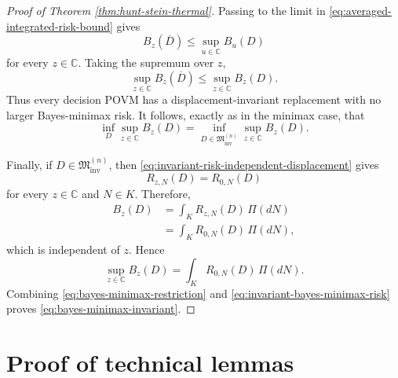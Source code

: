 \documentclass{article}
\theoremstyle{named}
\theoremstyle{named1}
\newcommand{\bbC}{\mathbb C}
\newcommand{\cM}{\mathfrak M}
\theoremstyle{plain}
\theoremstyle{remark}
\begin{document}
\begin{proof}[Proof of Theorem \ref{thm:hunt-stein-thermal}]
Passing to the limit in
\eqref{eq:averaged-integrated-risk-bound} gives
\begin{equation}
    B_z(\overline D)
    \leq
    \sup_{u\in\bbC}B_u(D)
    \label{eq:limit-integrated-risk-bound}
\end{equation}
for every \(z\in\bbC\). Taking the supremum over \(z\),
\begin{equation}
    \sup_{z\in\bbC}B_z(\overline D)
    \leq
    \sup_{z\in\bbC}B_z(D).
    \label{eq:bayes-minimax-invariant-improvement}
\end{equation}
Thus every decision POVM has a displacement-invariant replacement with no
larger Bayes-minimax risk. It follows, exactly as in the minimax case, that
\begin{equation}
    \inf_D\sup_{z\in\bbC}B_z(D)
    =
    \inf_{D\in\cM_{\mathrm{inv}}^{(n)}}
    \sup_{z\in\bbC}B_z(D).
    \label{eq:bayes-minimax-restriction}
\end{equation}

Finally, if \(D\in\cM_{\mathrm{inv}}^{(n)}\), then
\eqref{eq:invariant-risk-independent-displacement} gives
\[
    R_{z,N}(D)=R_{0,N}(D)
\]
for every \(z\in\bbC\) and \(N\in K\). Therefore,
\begin{align}
    B_z(D)
    &=
    \int_K
        R_{z,N}(D)\,
        \Pi(dN)
    \nonumber\\
    &=
    \int_K
        R_{0,N}(D)\,
        \Pi(dN),
    \label{eq:invariant-integrated-risk}
\end{align}
which is independent of \(z\). Hence
\begin{equation}
    \sup_{z\in\bbC}B_z(D)
    =
    \int_K
        R_{0,N}(D)\,
        \Pi(dN).
    \label{eq:invariant-bayes-minimax-risk}
\end{equation}
Combining \eqref{eq:bayes-minimax-restriction} and
\eqref{eq:invariant-bayes-minimax-risk} proves
\eqref{eq:bayes-minimax-invariant}.
\end{proof}

\section{Proof of technical lemmas}{\label{sec:tech_lem}}
\end{document}
